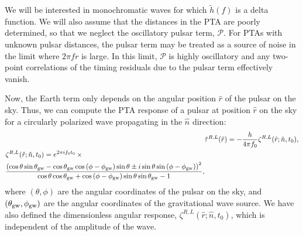 \documentclass[%
 reprint,
nofootinbib,
 amsmath,amssymb,
 aps,
]{revtex4-2}
\begin{document}
We will be interested in monochromatic waves for which $\tilde{h}(f)$ is a delta function. We will also assume that the distances in the PTA are poorly determined, so that we neglect the oscillatory pulsar term, $\mathcal{P}$. For PTAs with unknown pulsar distances, the pulsar term may be treated as a source of noise in the limit where $2 \pi f r$ is large. In this limit, $\mathcal{P}$ is highly oscillatory and any two-point correlations of the timing residuals due to the pulsar term effectively vanish. 

Now, the Earth term only depends on the angular position $\hat{r}$ of the pulsar on the sky. Thus, we can compute the PTA response of a pulsar at position $\hat{r}$ on the sky for a circularly polarized wave propagating in the $\hat{n}$ direction:
\begin{align}
    &\tilde{\tau}^{R,L}(\hat{r}) = -\frac{h}{4 \pi f_0} \zeta^{R,L}(\hat{r};\hat{n},t_0), \\
    \begin{split}
    &\zeta^{R,L}(\hat{r};\hat{n},t_0) = e^{2 \pi i f_0 t_0} \,
    \times \\
    &\frac{\left(\cos\theta \sin \theta_{\rm gw} - \cos \theta_{\rm gw} \cos \left( \phi - \phi_{\rm gw} \right) \sin \theta \pm i \sin \theta \sin \left( \phi - \phi_{\rm gw}\right) \right)^2}{\cos\theta \cos \theta_{\rm gw} + \cos\left(\phi - \phi_{\rm gw} \right) \sin\theta \sin \theta_{\rm gw} - 1},
    \end{split}
\end{align}
where $(\theta, \phi)$ are the angular coordinates of the pulsar on the sky, and $(\theta_{\rm gw}, \phi_{\rm gw})$ are the angular coordinates of the gravitational wave source. We have also defined the dimensionless angular response, $\zeta^{R,L}(\hat{r};\hat{n},t_0)$, which is independent of the amplitude of the wave.
\end{document}
